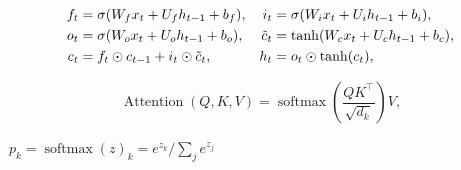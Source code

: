 \documentclass[11pt]{article}
\begin{document}

\begin{align}
f_t &= \sigma(W_f x_t + U_f h_{t-1} + b_f), &
i_t &= \sigma(W_i x_t + U_i h_{t-1} + b_i), \notag\\
o_t &= \sigma(W_o x_t + U_o h_{t-1} + b_o), &
\tilde{c}_t &= \tanh(W_c x_t + U_c h_{t-1} + b_c), \notag\\
c_t &= f_t \odot c_{t-1} + i_t \odot \tilde{c}_t, &
h_t &= o_t \odot \tanh(c_t),
\end{align}

\begin{equation}
\operatorname{Attention}(Q,K,V) = \operatorname{softmax}\!\left(\frac{QK^\top}{\sqrt{d_k}}\right) V,
\end{equation}

$ p_k = \operatorname{softmax}(z)_k = e^{z_k}/\sum_j e^{z_j} $
\end{document}
